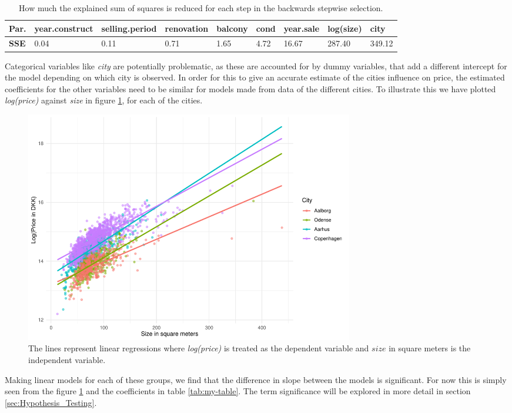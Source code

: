\begin{table}[H] 
\begin{tabular}{@{}lllllllll@{}}
\toprule
\textbf{Par.} & year.construct & selling.period & renovation & balcony & cond & year.sale & log(size) & city   \\ \midrule
\textbf{SSE} & 0.04           & 0.11           & 0.71       & 1.65    &   4.72   & 16.67     & 287.40    & 349.12 \\ \bottomrule
\end{tabular}
\caption{How much the explained sum of squares is reduced for each step in the backwards stepwise selection.}
\label{tbl:Parameter_SSE}
\end{table}
Categorical variables like \textit{city} are potentially problematic, as these are accounted for by dummy variables, that add a different intercept for the model depending on which city is observed.
In order for this to give an accurate estimate of the cities influence on price, the estimated coefficients for the other variables need to be similar for models made from data of the different cities. 
To illustrate this we have plotted \textit{log(price)} against \textit{size} in figure \ref{fig:Forskellig_haeldning}, for each of the cities.
\begin{figure}[H]
    \centering
    \includegraphics[width = 0.7\textwidth]{figures/Nanna/Forskellig_haeldning.pdf}
    \caption{The lines represent linear regressions where \textit{log(price)} is treated as the dependent variable and $size$ in square meters is the independent variable.}
    \label{fig:Forskellig_haeldning}
\end{figure}
Making linear models for each of these groups, we find that the difference in slope between the models is significant.
For now this is simply seen from the figure \ref{fig:Forskellig_haeldning} and the coefficients in table \ref{tab:my-table}.
The term significance will be explored in more detail in section \ref{sec:Hypothesis_Testing}. 


